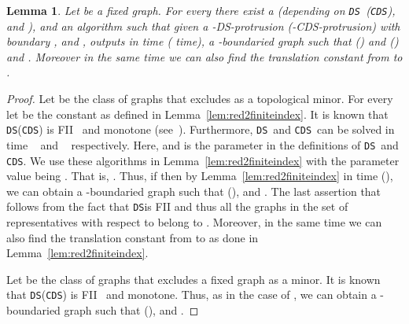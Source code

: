 \documentclass[11pt]{article}
\newtheorem{lemma}{Lemma}
\newcommand{\tDS}{{\texttt{\sc DS}}}
\newcommand{\tCDS}{{\texttt{\sc CDS}}}
\begin{document}
\begin{lemma}
\label{lem:fiidomset}
Let  be a fixed graph. For  every  there exist a  (depending on \tDS \, (\tCDS),  and ),  and 
an algorithm  such that given a -{\sc DS}-protrusion  (-{\sc CDS}-protrusion) with boundary  
,  and , 
 outputs in    time ( time),  
a -boundaried graph   such that   () and   () and . Moreover in the same time 
we can also find the translation constant  from   to . 



\end{lemma}

\begin{proof}
Let  be the class of  graphs that excludes  as a topological minor. 
For every  let  be the constant as defined in Lemma~\ref{lem:red2finiteindex}. It is known 
that  \tDS (\tCDS ) is FII\cal~\cite{H.Bodlaender:2009ng} and monotone (see~\cite[Lemmas 7.3 and 7.4]{H.Bodlaender:2009ng}). Furthermore, \tDS \, and \tCDS \, can be solved in time  ~\cite[Theorem 4]{AlonG09} 
and  ~\cite[Theorem 1]{GolovachV08}  respectively.  Here,  and  is the parameter in the definitions of  \tDS \, and \tCDS. We  use these algorithms in Lemma~\ref{lem:red2finiteindex} with the parameter value being . That is, . 
Thus, if   then 
by  Lemma~\ref{lem:red2finiteindex} in time    (), we can obtain a 
-boundaried graph   such that  (),   and 
.   The last assertion that   follows from the fact that  \tDS is FII and thus all the graphs in the set of representatives with respect to  belong to . 
Moreover, in the same time 
we can also find the translation constant  from   to  as done in Lemma~\ref{lem:red2finiteindex}. 

Let   be the class of  graphs that excludes a fixed graph  as a minor. It is known 
that  \tDS (\tCDS ) is FII\cal~\cite{H.Bodlaender:2009ng} and monotone. Thus, as in the case of , we can  obtain a 
-boundaried graph   such that  (),   and 
.
\end{proof}







\begin{center}
  \end{center}
\end{document}
